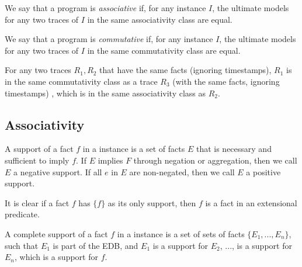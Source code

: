 \begin{definition}
%
We say that a \lang program is {\em associative} if, for any instance $I$,  the
ultimate models for any two traces of $I$ in the same associativity class are
equal.
%
\end{definition}

\begin{definition}
%
We say that a \lang program is {\em commutative} if, for any instance $I$, the
ultimate models for any two traces of $I$ in the same commutativity class are
equal.
%
\end{definition}

\begin{lemma} \label{lem:assoc-comm}
%
For any two traces $R_1, R_2$ that have the same facts (ignoring timestamps),
$R_1$ is in the same commutativity class as a trace $R_3$ (with the same facts,
ignoring timestamps) , which is in the same associativity class as $R_2$.
%
\end{lemma}

\subsection{Associativity}

%
%

\begin{definition}
%
A support of a fact $f$ in a \lang instance is a set of facts $E$ that is
necessary and sufficient to imply $f$.  If $E$ implies $F$ through negation or
aggregation, then we call $E$ a negative support.  If all $e$ in $E$ are
non-negated, then we call $E$ a positive support.
%
\end{definition}

It is clear if a fact $f$ has $\{f\}$ as its only support, then $f$ is a fact
in an extensional predicate.

\begin{definition}
%
A complete support of a fact $f$ in a \lang instance is a set of sets of facts
$\{E_1, ..., E_n\}$, such that $E_1$ is part of the EDB, and $E_1$ is a support
for $E_2$, ..., is a support for $E_n$, which is a support for $f$.
%
\end{definition}


